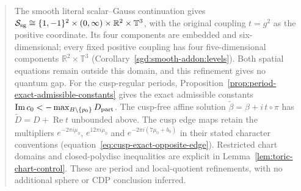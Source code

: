 \documentclass[11pt,letterpaper]{article}
\theoremstyle{definition}
\theoremstyle{remark}
\begin{document}
\begin{abstract}
The smooth literal scalar--Gauss continuation gives
$\mathcal S_{\rm sg}\cong\{1,-1\}^2\times(0,\infty)
\times\mathbb R^2\times\mathbb T^3$, with the original coupling
$t=g^2$ as the positive coordinate. Its four components are embedded
and six-dimensional; every fixed positive coupling has four
five-dimensional components $\mathbb R^2\times\mathbb T^3$
(Corollary~\ref{sgd:smooth-addon:levels}). Both spatial equations
remain outside this domain, and this refinement gives no quantum gap.
For the cusp-regular periods, Proposition~\ref{prop:period-exact-admissible-constants}
gives the exact admissible constants
$\operatorname{Im}c_0<-\max_{B\setminus\{p_0\}}D_{\rm part}$.
The cusp-free affine solution $\widetilde\beta=\beta+i\,t\circ\pi$
has $\widetilde D=D+\operatorname{Re}t$ unbounded above.
The cusp edge maps retain the multipliers
$e^{-2\pi i\mu_0}$, $e^{12\pi i\mu_0}$ and
$e^{-2\pi i(7\mu_0+b_0)}$ in their stated character conventions
(equation~\eqref{eq:cusp-exact-opposite-edge}). Restricted chart domains
and closed-polydisc inequalities are explicit in
Lemma~\ref{lem:toric-chart-control}. These are period and local-quotient
refinements, with no additional sphere or CDP conclusion inferred.


\end{abstract}
\end{document}
